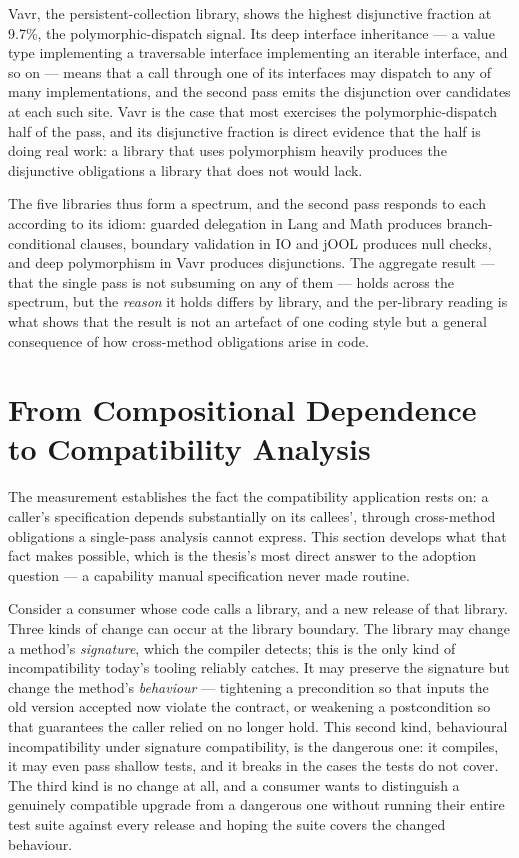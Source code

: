Vavr, the persistent-collection library, shows the highest disjunctive fraction
at 9.7\%, the polymorphic-dispatch signal. Its deep interface inheritance --- a
value type implementing a traversable interface implementing an iterable
interface, and so on --- means that a call through one of its interfaces may
dispatch to any of many implementations, and the second pass emits the
disjunction over candidates at each such site. Vavr is the case that most
exercises the polymorphic-dispatch half of the pass, and its disjunctive fraction
is direct evidence that the half is doing real work: a library that uses
polymorphism heavily produces the disjunctive obligations a library that does not
would lack.

The five libraries thus form a spectrum, and the second pass responds to each
according to its idiom: guarded delegation in Lang and Math produces
branch-conditional clauses, boundary validation in IO and jOOL produces null
checks, and deep polymorphism in Vavr produces disjunctions. The aggregate result
--- that the single pass is not subsuming on any of them --- holds across the
spectrum, but the \emph{reason} it holds differs by library, and the per-library
reading is what shows that the result is not an artefact of one coding style but a
general consequence of how cross-method obligations arise in code.

\section{From Compositional Dependence to Compatibility Analysis}
\label{sec:comp-compatibility}

The measurement establishes the fact the compatibility application rests on: a
caller's specification depends substantially on its callees', through cross-method
obligations a single-pass analysis cannot express. This section develops what that
fact makes possible, which is the thesis's most direct answer to the adoption
question --- a capability manual specification never made routine.

Consider a consumer whose code calls a library, and a new release of that library.
Three kinds of change can occur at the library boundary. The library may change a
method's \emph{signature}, which the compiler detects; this is the only kind of
incompatibility today's tooling reliably catches. It may preserve the signature but
change the method's \emph{behaviour} --- tightening a precondition so that inputs
the old version accepted now violate the contract, or weakening a postcondition so
that guarantees the caller relied on no longer hold. This second kind, behavioural
incompatibility under signature compatibility, is the dangerous one: it compiles,
it may even pass shallow tests, and it breaks in the cases the tests do not cover.
The third kind is no change at all, and a consumer wants to distinguish a
genuinely compatible upgrade from a dangerous one without running their entire
test suite against every release and hoping the suite covers the changed
behaviour.

